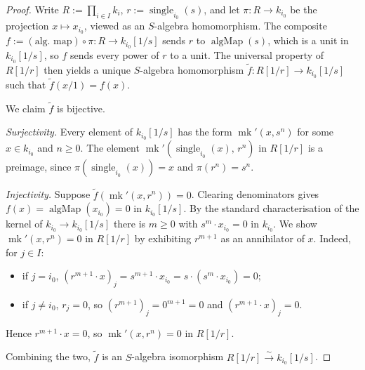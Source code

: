 \begin{proof}
  \leanok
  Write $R := \prod_{i \in I} k_i$, $r := \operatorname{single}_{i_0}(s)$,
  and let $\pi : R \to k_{i_0}$ be the projection $x \mapsto x_{i_0}$,
  viewed as an $S$-algebra homomorphism. The composite
  $f := (\text{alg. map}) \circ \pi : R \to k_{i_0}[1/s]$ sends $r$ to
  $\operatorname{algMap}(s)$, which is a unit in $k_{i_0}[1/s]$, so $f$
  sends every power of $r$ to a unit. The universal property of
  $R[1/r]$ then yields a unique $S$-algebra homomorphism
  $\widetilde{f} : R[1/r] \to k_{i_0}[1/s]$ such that
  $\widetilde{f}(x/1) = f(x)$.

  We claim $\widetilde{f}$ is bijective.

  \emph{Surjectivity.} Every element of $k_{i_0}[1/s]$ has the form
  $\operatorname{mk}'(x, s^n)$ for some $x \in k_{i_0}$ and $n \geq 0$.
  The element $\operatorname{mk}'(\operatorname{single}_{i_0}(x),\,r^n)$
  in $R[1/r]$ is a preimage, since $\pi(\operatorname{single}_{i_0}(x))
  = x$ and $\pi(r^n) = s^n$.

  \emph{Injectivity.} Suppose $\widetilde{f}(\operatorname{mk}'(x, r^n))
  = 0$. Clearing denominators gives $f(x) = \operatorname{algMap}(x_{i_0})
  = 0$ in $k_{i_0}[1/s]$. By the standard characterisation of the kernel
  of $k_{i_0} \to k_{i_0}[1/s]$ there is $m \geq 0$ with
  $s^m \cdot x_{i_0} = 0$ in $k_{i_0}$. We show
  $\operatorname{mk}'(x, r^n) = 0$ in $R[1/r]$ by exhibiting
  $r^{m+1}$ as an annihilator of $x$. Indeed, for $j \in I$:
  \begin{itemize}
    \item if $j = i_0$, $(r^{m+1} \cdot x)_j = s^{m+1} \cdot x_{i_0} =
      s \cdot (s^m \cdot x_{i_0}) = 0$;
    \item if $j \neq i_0$, $r_j = 0$, so $(r^{m+1})_j = 0^{m+1} = 0$ and
      $(r^{m+1} \cdot x)_j = 0$.
  \end{itemize}
  Hence $r^{m+1} \cdot x = 0$, so $\operatorname{mk}'(x, r^n) = 0$ in
  $R[1/r]$.

  Combining the two, $\widetilde{f}$ is an $S$-algebra isomorphism
  $R[1/r] \xrightarrow{\sim} k_{i_0}[1/s]$.
\end{proof}
